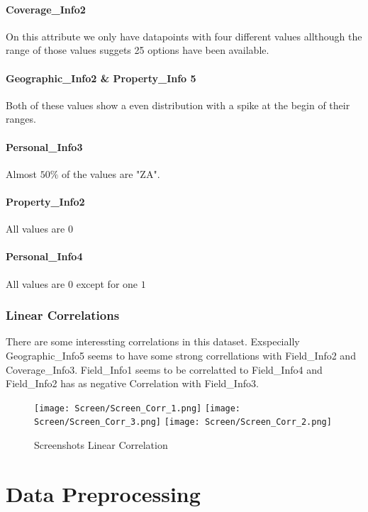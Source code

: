 \paragraph{Coverage\_Info2} On this attribute we only have datapoints with four different values allthough the range of those values suggets 25 options have been available.

\paragraph{Geographic\_Info2 \& Property\_Info 5} Both of these values show a  even distribution with a spike at the begin of their ranges.

\paragraph{Personal\_Info3} Almost $50 \text{\%}$ of the values are "ZA".
\paragraph{Property\_Info2} All values are $0$
\paragraph{Personal\_Info4} All values are $0$ except for one $1$

\subsubsection{Linear Correlations}

There are some interessting correlations in this dataset. Exspecially Geographic\_Info5 seems to have some strong correllations with Field\_Info2 and Coverage\_Info3. Field\_Info1 seems to be correlatted to Field\_Info4 and Field\_Info2 has as negative Correlation with Field\_Info3.

\begin{figure}[H]
	\begin{center}
		\texttt{[image: Screen/Screen\_Corr\_1.png]}
		\texttt{[image: Screen/Screen\_Corr\_3.png]}
		\texttt{[image: Screen/Screen\_Corr\_2.png]}

	\end{center}
	\caption{Screenshots Linear Correlation}
\end{figure}

\section{Data Preprocessing}
